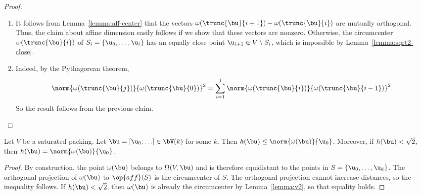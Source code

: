 \begin{proof}
\begin{enumerate}
\item{}
It follows from  Lemma~\ref{lemma:aff-center} that the vectors 
${\omega(\trunc{\bu}{i+1})}-{\omega(\trunc{\bu}{i})}$ are mutually orthogonal.
Thus, the claim about affine dimension easily follows if we show that these vectors
are nonzero.
Otherwise, the
circumcenter $\omega(\trunc{\bu}{i})$ of $S_i=\{\u_0,\ldots,\u_i\}$
has an equally close point $ \u_{i+1}\in V\setminus S_i$, which is
impossible by Lemma~\ref{lemma:sqrt2-close}.

\item{}  
Indeed, by the Pythagorean theorem,
\begin{equation} 
\norm{\omega(\trunc{\bu}{j})}{\omega(\trunc{\bu}{0})}^2 =
\sum_{i=1}^{j} \norm{\omega(\trunc{\bu}{i})}{\omega(\trunc{\bu}{i-1})}^2.
\end{equation}
So the result follows from the
previous claim.
\end{enumerate}
\end{proof}



\begin{lemma}
  Let $V$ be a saturated packing.  Let $\bu =[\u_0;\ldots]\in
  \bV(k)$ for some $k$.  Then $h(\bu)\le
  \norm{\omega(\bu)}{\u_0}$.  Moreover, if $h(\bu)<\sqrt2$, then
  $h(\bu)=\norm{\omega(\bu)}{\u_0}$.
\end{lemma}

\begin{proof} By construction, the point $\omega(\bu)$ belongs to
  $\Omega(V,\bu)$ and is therefore equidistant to the points in
  $S=\{\u_0,\ldots,\u_k\}$.  The orthogonal projection of
  $\omega(\bu)$ to $\op{aff}(S)$ is the circumcenter of $S$.  The
  orthogonal projection cannot increase distances, so the inequality
  follows.  If $h(\bu)<\sqrt2$, then $\omega(\bu)$ is already the
  circumcenter by Lemma~\ref{lemma:v2}, so that equality holds.
\end{proof}

